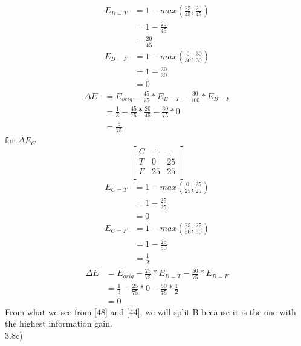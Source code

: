 \documentclass[12pt,english]{article}
\begin{document}
\begin{equation*}\tag{2}\label{eq:42}
\begin{split}
E_{B=T} &= 1 - max(\frac{25}{45},\frac{20}{45})\\
&=1 - \frac{25}{45}\\
&=\frac{20}{45}
\end{split}
\end{equation*}
\begin{equation*}\tag{3}\label{eq:43}
\begin{split}
E_{B=F} &= 1 - max(\frac{0}{30},\frac{30}{30})\\
&=1 - \frac{30}{30}\\
&=0
\end{split}
\end{equation*}
\begin{equation*}\tag{4}\label{eq:44}
\begin{split}
\Delta E &= E_{orig} - \frac{45}{75} * E_{B=T} - \frac{30}{100} * E_{B=F}\\
&= \frac{1}{3} -\frac{45}{75} *\frac{20}{45} - \frac{30}{75} *0\\
&= \frac{5}{75}
\end{split}
\end{equation*}
for $\Delta E_{C}$\\
\begin{equation*}\tag{5}\label{eq:45}
\begin{bmatrix} C & + & - \\T & 0 &  25 \\F & 25 & 25 \\ \end{bmatrix}
\end{equation*}
\begin{equation*}\tag{6}\label{eq:46}
\begin{split}
E_{C=T} &= 1 - max(\frac{0}{25},\frac{25}{25})\\
&=1 - \frac{25}{25}\\
&=0
\end{split}
\end{equation*}
\begin{equation*}\tag{7}\label{eq:47}
\begin{split}
E_{C=F} &= 1 - max(\frac{25}{50},\frac{25}{50})\\
&=1 - \frac{25}{50}\\
&=\frac{1}{2}
\end{split}
\end{equation*}
\begin{equation*}\tag{8}\label{eq:48}
\begin{split}
\Delta E &= E_{orig} - \frac{25}{75} * E_{B=T} - \frac{50}{75} * E_{B=F}\\
&= \frac{1}{3} -\frac{25}{75} * 0 - \frac{50}{75} *\frac{1}{2}\\
&= 0
\end{split}
\end{equation*}
From what we see from \eqref{48} and \eqref{44}, we will split B because it is the one with the highest information gain.\\
3.8c)\\
\end{document}

